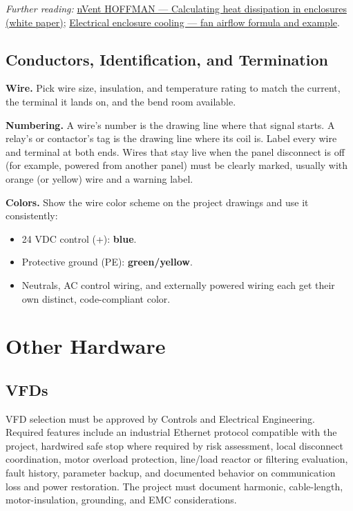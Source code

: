 \textit{Further reading:} \href{https://www.nvent.com/sites/default/files/acquiadam/assets/Heat\%20dissipation_En_nVent_HOFFMAN_2.pdf}{nVent HOFFMAN --- Calculating heat dissipation in enclosures (white paper)}; \href{https://www.proventofan.com/how-to-calculate-electrical-enclosure-cooling-formula-example-and-fan-sizing/}{Electrical enclosure cooling --- fan airflow formula and example}.

\subsection{Conductors, Identification, and Termination}
\textbf{Wire.} Pick wire size, insulation, and temperature rating to match the current, the terminal it lands on, and the bend room available.

\textbf{Numbering.} A wire's number is the drawing line where that signal starts. A relay's or contactor's tag is the drawing line where its coil is. Label every wire and terminal at both ends. Wires that stay live when the panel disconnect is off (for example, powered from another panel) must be clearly marked, usually with orange (or yellow) wire and a warning label.

\textbf{Colors.} Show the wire color scheme on the project drawings and use it consistently:
\begin{itemize}[itemsep=1pt]
  \item 24 VDC control (+): \textbf{blue}.
  \item Protective ground (PE): \textbf{green/yellow}.
  \item Neutrals, AC control wiring, and externally powered wiring each get their own distinct, code-compliant color.
\end{itemize}

\section{Other Hardware}
\subsection{VFDs}
VFD selection must be approved by Controls and Electrical Engineering. Required features include an industrial Ethernet protocol compatible with the project, hardwired safe stop where required by risk assessment, local disconnect coordination, motor overload protection, line/load reactor or filtering evaluation, fault history, parameter backup, and documented behavior on communication loss and power restoration. The project must document harmonic, cable-length, motor-insulation, grounding, and EMC considerations.
